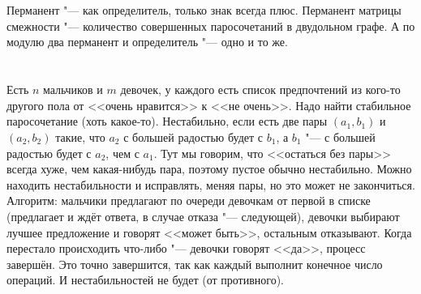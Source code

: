 \section{} %
Перманент "--- как определитель, только знак всегда плюс.
Перманент матрицы смежности "--- количество совершенных паросочетаний в двудольном графе.
А по модулю два перманент и определитель "--- одно и то же.

\section{} %
Есть $n$ мальчиков и $m$ девочек, у каждого есть список предпочтений из кого-то другого пола от <<очень нравится>> к <<не очень>>.
Надо найти стабильное паросочетание (хоть какое-то).
Нестабильно, если есть две пары $(a_1, b_1)$ и $(a_2, b_2)$ такие, что $a_2$ с большей радостью будет с $b_1$, а $b_1$ "--- с большей радостью будет с $a_2$, чем с $a_1$.
Тут мы говорим, что <<остаться без пары>> всегда хуже, чем какая-нибудь пара, поэтому пустое обычно нестабильно.
Можно находить нестабильности и исправлять, меняя пары, но это может не закончиться.
Алгоритм: мальчики предлагают по очереди девочкам от первой в списке (предлагает и ждёт ответа, в случае отказа "--- следующей), девочки выбирают лучшее предложение и говорят <<может быть>>, остальным отказывают.
Когда перестало происходить что-либо "--- девочки говорят <<да>>, процесс завершён.
Это точно завершится, так как каждый выполнит конечное число операций.
И нестабильностей не будет (от противного).
